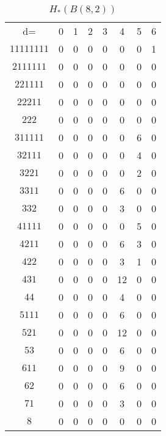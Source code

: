 \documentclass{amsart}
\begin{document}
\begin{table}
\begin{tabular}{cccccccc}
d= & 0 & 1 & 2 & 3 & 4 & 5 & 6  \\
$11111111$ & 0 & 0 & 0 & 0 & 0 & 0 & 1  \\
$2111111$  & 0 & 0 & 0 & 0 & 0 & 0 & 0  \\
$221111$   & 0 & 0 & 0 & 0 & 0 & 0 & 0  \\
$22211$    & 0 & 0 & 0 & 0 & 0 & 0 & 0  \\
$222$      & 0 & 0 & 0 & 0 & 0 & 0 & 0  \\
$311111$   & 0 & 0 & 0 & 0 & 0 & 6 & 0  \\
$32111$    & 0 & 0 & 0 & 0 & 0 & 4 & 0  \\
$3221$     & 0 & 0 & 0 & 0 & 0 & 2 & 0  \\
$3311$     & 0 & 0 & 0 & 0 & 6 & 0 & 0  \\
$332$      & 0 & 0 & 0 & 0 & 3 & 0 & 0  \\
$41111$    & 0 & 0 & 0 & 0 & 0 & 5 & 0  \\
$4211$     & 0 & 0 & 0 & 0 & 6 & 3 & 0  \\
$422$      & 0 & 0 & 0 & 0 & 3 & 1 & 0  \\
$431$      & 0 & 0 & 0 & 0 & 12 & 0 & 0  \\
$44$       & 0 & 0 & 0 & 0 & 4 & 0 & 0  \\
$5111$     & 0 & 0 & 0 & 0 & 6 & 0 & 0  \\
$521$      & 0 & 0 & 0 & 0 & 12 & 0 & 0  \\
$53$       & 0 & 0 & 0 & 0 & 6 & 0 & 0  \\
$611$      & 0 & 0 & 0 & 0 & 9 & 0 & 0  \\
$62$       & 0 & 0 & 0 & 0 & 6 & 0 & 0  \\
$71$       & 0 & 0 & 0 & 0 & 3 & 0 & 0  \\ $8$        & 0 & 0 & 0 & 0 & 0 & 0 & 0  \\
\end{tabular}
\caption[$H_*(B(8,2))$]{$H_*(B(8, 2))$}
\label{T:8_2}
\end{table}
\end{document}
